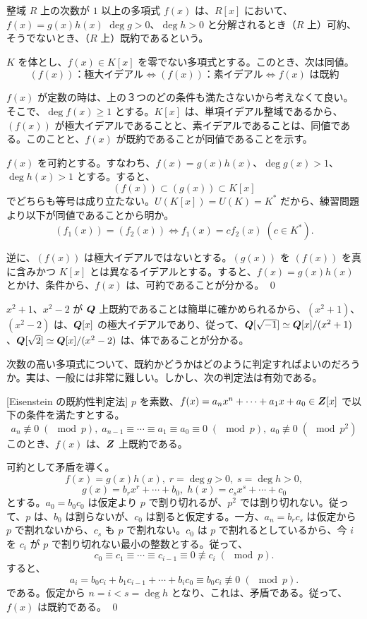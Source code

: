 \begin{definition}
整域 $R$ 上の次数が $1$ 以上の多項式 $f(x)$ は、$R[x]$ において、$f(x) = g(x)h(x)$ $\deg g>0$、$\deg h>0$ と分解されるとき（$R$ 上）可約、そうでないとき、（$R$ 上）既約であるという。
\end{definition}

\begin{prop}\label{prop:poly}
$K$ を体とし、$f(x)\in K[x]$ を零でない多項式とする。このとき、次は同値。
$$(f(x))\mbox{：極大イデアル} \Leftrightarrow (f(x))\mbox{：素イデアル}\Leftrightarrow f(x)\mbox{ は既約}$$
\end{prop}
\proof
$f(x)$ が定数の時は、上の３つのどの条件も満たさないから考えなくて良い。そこで、$\deg f(x)\geq 1$ とする。$K[x]$ は、単項イデアル整域であるから、$(f(x))$ が極大イデアルであることと、素イデアルであることは、同値である。このことと、$f(x)$ が既約であることが同値であることを示す。

$f(x)$ を可約とする。すなわち、$f(x) = g(x)h(x)$、$\deg g(x)>1$、$\deg h(x)>1$ とする。すると、
$$(f(x)) \subset (g(x)) \subset K[x]$$
でどちらも等号は成り立たない。$U(K[x]) = U(K) = K^*$ だから、練習問題より以下が同値であることから明か。
$$(f_1(x)) = (f_2(x)) \Leftrightarrow f_1(x) = cf_2(x)\;(c\in K^*).$$

逆に、$(f(x))$ は極大イデアルではないとする。$(g(x))$ を $(f(x))$ を真に含みかつ $K[x]$ とは異なるイデアルとする。すると、$f(x) = g(x)h(x)$ とかけ、条件から、$f(x)$ は、可約であることが分かる。
\qed

\begin{eg}
$x^2+1$、$x^2-2$ が $\mbox{\boldmath $Q$}$ 上既約であることは簡単に確かめられるから、$(x^2+1)$、$(x^2-2)$ は、$\mbox{\boldmath $Q$}[x]$ の極大イデアルであり、従って、$\mbox{\boldmath $Q$}[\sqrt{-1}]\simeq \mbox{\boldmath $Q$}[x]/(x^2+1)$、$\mbox{\boldmath $Q$}[\sqrt{2}]\simeq \mbox{\boldmath $Q$}[x]/(x^2-2)$ は、体であることが分かる。
\end{eg}

次数の高い多項式について、既約かどうかはどのように判定すればよいのだろうか。実は、一般には非常に難しい。しかし、次の判定法は有効である。

\begin{prop}{\rm [Eisenstein の既約性判定法]}\label{prop:eisenstein}
$p$ を素数、$f(x) = a_nx^n + \cdots + a_1x + a_0\in \mbox{\boldmath $Z$}[x]$ で以下の条件を満たすとする。
$$a_n\not\equiv 0 \;(\mod p),\;a_{n-1}\equiv \cdots \equiv a_1 \equiv a_0 \equiv 0\;(\mod p),\;a_0 \not\equiv 0\;(\mod p^2)$$
このとき、$f(x)$ は、$\mbox{\boldmath $Z$}$ 上既約である。
\end{prop}
\proof
可約として矛盾を導く。
$$f(x) = g(x)h(x),\;r = \deg g>0,\;s = \deg h>0,$$
$$g(x) = b_rx^r + \cdots + b_0,\;h(x) = c_sx^s + \cdots + c_0$$
とする。$a_0 = b_0c_0$ は仮定より $p$ で割り切れるが、$p^2$ では割り切れない。従って、$p$ は、$b_0$ は割らないが、$c_0$ は割ると仮定する。一方、$a_n = b_rc_s$ は仮定から $p$ で割れないから、$c_s$ も $p$ で割れない。$c_0$ は $p$ で割れるとしているから、今 $i$ を $c_i$ が $p$ で割り切れない最小の整数とする。従って、
$$c_0 \equiv c_1 \equiv \cdots \equiv c_{i-1} \equiv 0 \not\equiv c_i\;(\mod p).$$
すると、
$$a_i = b_0c_i + b_1c_{i-1} + \cdots + b_ic_0\equiv b_0c_i \not\equiv 0\;(\mod p).$$
である。仮定から $n = i < s = \deg h$ となり、これは、矛盾である。従って、$f(x)$ は既約である。
\qed

